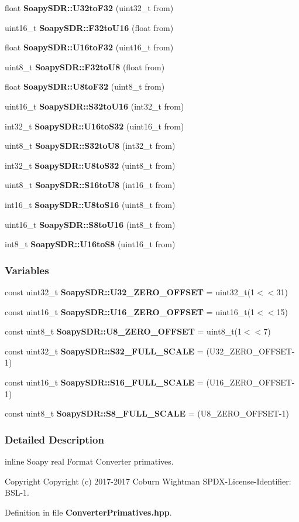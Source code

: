 \begin{DoxyCompactItemize}
float {\bf Soapy\+S\+D\+R\+::\+U32to\+F32} (uint32\+\_\+t from)
\item 
uint16\+\_\+t {\bf Soapy\+S\+D\+R\+::\+F32to\+U16} (float from)
\item 
float {\bf Soapy\+S\+D\+R\+::\+U16to\+F32} (uint16\+\_\+t from)
\item 
uint8\+\_\+t {\bf Soapy\+S\+D\+R\+::\+F32to\+U8} (float from)
\item 
float {\bf Soapy\+S\+D\+R\+::\+U8to\+F32} (uint8\+\_\+t from)
\item 
uint16\+\_\+t {\bf Soapy\+S\+D\+R\+::\+S32to\+U16} (int32\+\_\+t from)
\item 
int32\+\_\+t {\bf Soapy\+S\+D\+R\+::\+U16to\+S32} (uint16\+\_\+t from)
\item 
uint8\+\_\+t {\bf Soapy\+S\+D\+R\+::\+S32to\+U8} (int32\+\_\+t from)
\item 
int32\+\_\+t {\bf Soapy\+S\+D\+R\+::\+U8to\+S32} (uint8\+\_\+t from)
\item 
uint8\+\_\+t {\bf Soapy\+S\+D\+R\+::\+S16to\+U8} (int16\+\_\+t from)
\item 
int16\+\_\+t {\bf Soapy\+S\+D\+R\+::\+U8to\+S16} (uint8\+\_\+t from)
\item 
uint16\+\_\+t {\bf Soapy\+S\+D\+R\+::\+S8to\+U16} (int8\+\_\+t from)
\item 
int8\+\_\+t {\bf Soapy\+S\+D\+R\+::\+U16to\+S8} (uint16\+\_\+t from)
\end{DoxyCompactItemize}
\subsubsection*{Variables}
\begin{DoxyCompactItemize}
\item 
const uint32\+\_\+t {\bf Soapy\+S\+D\+R\+::\+U32\+\_\+\+Z\+E\+R\+O\+\_\+\+O\+F\+F\+S\+ET} = uint32\+\_\+t(1$<$$<$31)
\item 
const uint16\+\_\+t {\bf Soapy\+S\+D\+R\+::\+U16\+\_\+\+Z\+E\+R\+O\+\_\+\+O\+F\+F\+S\+ET} = uint16\+\_\+t(1$<$$<$15)
\item 
const uint8\+\_\+t {\bf Soapy\+S\+D\+R\+::\+U8\+\_\+\+Z\+E\+R\+O\+\_\+\+O\+F\+F\+S\+ET} = uint8\+\_\+t(1$<$$<$7)
\item 
const uint32\+\_\+t {\bf Soapy\+S\+D\+R\+::\+S32\+\_\+\+F\+U\+L\+L\+\_\+\+S\+C\+A\+LE} = (U32\+\_\+\+Z\+E\+R\+O\+\_\+\+O\+F\+F\+S\+ET-\/1)
\item 
const uint16\+\_\+t {\bf Soapy\+S\+D\+R\+::\+S16\+\_\+\+F\+U\+L\+L\+\_\+\+S\+C\+A\+LE} = (U16\+\_\+\+Z\+E\+R\+O\+\_\+\+O\+F\+F\+S\+ET-\/1)
\item 
const uint8\+\_\+t {\bf Soapy\+S\+D\+R\+::\+S8\+\_\+\+F\+U\+L\+L\+\_\+\+S\+C\+A\+LE} = (U8\+\_\+\+Z\+E\+R\+O\+\_\+\+O\+F\+F\+S\+ET-\/1)
\end{DoxyCompactItemize}


\subsubsection{Detailed Description}
inline Soapy real Format Converter primatives. 

\begin{DoxyCopyright}{Copyright}
Copyright (c) 2017-\/2017 Coburn Wightman S\+P\+D\+X-\/\+License-\/\+Identifier\+: B\+S\+L-\/1. 
\end{DoxyCopyright}


Definition in file {\bf Converter\+Primatives.\+hpp}.

